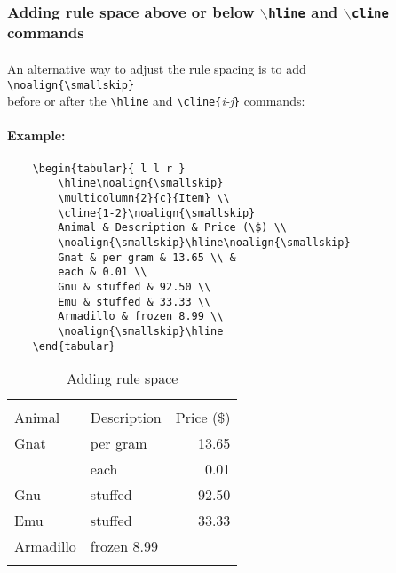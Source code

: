 \documentclass[11pt,a4paper]{article}
\begin{document}
\subsubsection[Adding rule space]{Adding rule space above or below \texttt{$\backslash$hline} and \texttt{$\backslash$cline} commands}

\paragraph{}
An alternative way to adjust the rule spacing is to add \\ \verb|\noalign{\smallskip}|
\\ before or after the \verb|\hline| and \verb|\cline{|\emph{i-j}\verb|}| commands:

\paragraph{Example:}
\begin{verbatim}
	\begin{tabular}{ l l r }
		\hline\noalign{\smallskip}
		\multicolumn{2}{c}{Item} \\
		\cline{1-2}\noalign{\smallskip}
		Animal & Description & Price (\$) \\
		\noalign{\smallskip}\hline\noalign{\smallskip}
		Gnat & per gram & 13.65 \\ &
		each & 0.01 \\
		Gnu & stuffed & 92.50 \\
		Emu & stuffed & 33.33 \\
		Armadillo & frozen 8.99 \\
		\noalign{\smallskip}\hline
	\end{tabular}
	\end{verbatim}

\begin{table}[htnp]
	\centering
	\begin{tabular}{ l l r }
		\hline\noalign{\smallskip}
		\multicolumn{2}{c}{Item} \\
		\cline{1-2}\noalign{\smallskip}
		Animal & Description & Price (\$) \\
		\noalign{\smallskip}\hline\noalign{\smallskip}
		Gnat & per gram & 13.65 \\ &
		each & 0.01 \\
		Gnu & stuffed & 92.50 \\
		Emu & stuffed & 33.33 \\
		Armadillo & frozen 8.99 \\
		\noalign{\smallskip}\hline
	\end{tabular}
	\caption{Adding rule space } %
	\label{addingrulespace}
\end{table}
\end{document}
